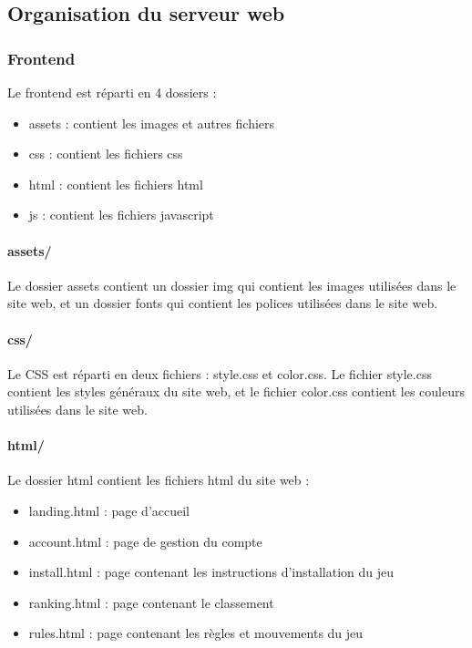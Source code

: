 \documentclass[12pt, openany]{article}
\begin{document}
	\subsection{Organisation du serveur web}
	\subsubsection{Frontend}
	Le frontend est réparti en 4 dossiers :
	\begin{itemize}[label=$-$]
		\item assets : contient les images et autres fichiers\\
		\item css : contient les fichiers css\\
		\item html : contient les fichiers html\\
		\item js : contient les fichiers javascript\\
	\end{itemize}

	\paragraph{assets/}
	Le dossier assets contient un dossier img qui contient les images utilisées dans le site web, et un dossier fonts qui contient les polices utilisées dans le site web.

	\paragraph {css/}
	Le CSS est réparti en deux fichiers : style.css et color.css. Le fichier style.css contient les styles généraux du site web, et le fichier color.css contient les couleurs utilisées dans le site web.

	\paragraph {html/}
	Le dossier html contient les fichiers html du site web :
	\begin{itemize}[label=$-$]
		\item landing.html : page d'accueil\\
		\item account.html : page de gestion du compte\\
		\item install.html : page contenant les instructions d'installation du jeu\\
		\item ranking.html : page contenant le classement\\
		\item rules.html : page contenant les règles et mouvements du jeu\\
	\end{itemize}
\end{document}
